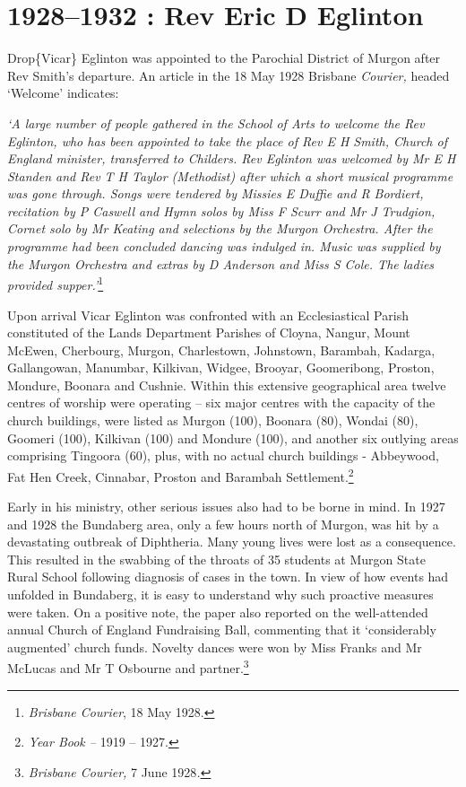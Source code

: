 \hypertarget{rev-eric-d-eglinton}{%
\chapter{1928--1932 : Rev Eric D Eglinton}\label{rev-eric-d-eglinton}}

Drop\{Vicar\} Eglinton was appointed to the Parochial District of Murgon after Rev Smith's departure. An article in the 18 May 1928 Brisbane \emph{Courier,} headed `Welcome' indicates:

\emph{`A large number of people gathered in the School of Arts to welcome the Rev Eglinton, who has been appointed to take the place of Rev E H Smith, Church of England minister, transferred to Childers. Rev Eglinton was welcomed by Mr E H Standen and Rev T H Taylor (Methodist) after which a short musical programme was gone through. Songs were tendered by Missies E Duffie and R Bordiert, recitation by P Caswell and Hymn solos by Miss F Scurr and Mr J Trudgion, Cornet solo by Mr Keating and selections by the Murgon Orchestra. After the programme had been concluded dancing was indulged in. Music was supplied by the Murgon Orchestra and extras by D Anderson and Miss S Cole. The ladies provided supper.'}\footnote{\emph{Brisbane Courier}, 18 May 1928.}

Upon arrival Vicar Eglinton was confronted with an Ecclesiastical Parish constituted of the Lands Department Parishes of Cloyna, Nangur, Mount McEwen, Cherbourg, Murgon, Charlestown, Johnstown, Barambah, Kadarga, Gallangowan, Manumbar, Kilkivan, Widgee, Brooyar, Goomeribong, Proston, Mondure, Boonara and Cushnie. Within this extensive geographical area twelve centres of worship were operating -- six major centres with the capacity of the church buildings, were listed as Murgon (100), Boonara (80), Wondai (80), Goomeri (100), Kilkivan (100) and Mondure (100), and another six outlying areas comprising Tingoora (60), plus, with no actual church buildings - Abbeywood, Fat Hen Creek, Cinnabar, Proston and Barambah Settlement.\footnote{\emph{Year Book --} 1919 -- 1927.}

Early in his ministry, other serious issues also had to be borne in mind. In 1927 and 1928 the Bundaberg area, only a few hours north of Murgon, was hit by a devastating outbreak of Diphtheria. Many young lives were lost as a consequence. This resulted in the swabbing of the throats of 35 students at Murgon State Rural School following diagnosis of cases in the town. In view of how events had unfolded in Bundaberg, it is easy to understand why such proactive measures were taken. On a positive note, the paper also reported on the well-attended annual Church of England Fundraising Ball, commenting that it `considerably augmented' church funds. Novelty dances were won by Miss Franks and Mr McLucas and Mr T Osbourne and partner.\footnote{\emph{Brisbane Courier,} 7 June 1928\emph{.}}


